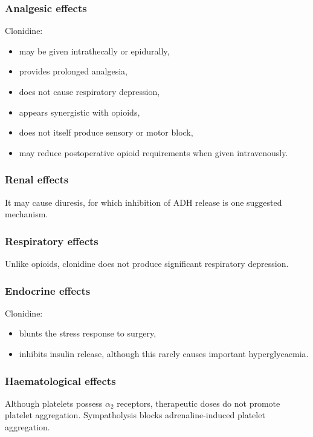 \documentclass[11pt,a4paper]{article}
\begin{document}
\subsubsection{Analgesic effects}

Clonidine:
\begin{itemize}
    \item may be given intrathecally or epidurally,
    \item provides prolonged analgesia,
    \item does not cause respiratory depression,
    \item appears synergistic with opioids,
    \item does not itself produce sensory or motor block,
    \item may reduce postoperative opioid requirements when given intravenously.
\end{itemize}

\subsubsection{Renal effects}

It may cause diuresis, for which inhibition of ADH release is one suggested mechanism.

\subsubsection{Respiratory effects}

Unlike opioids, clonidine does not produce significant respiratory depression.

\subsubsection{Endocrine effects}

Clonidine:
\begin{itemize}
    \item blunts the stress response to surgery,
    \item inhibits insulin release, although this rarely causes important hyperglycaemia.
\end{itemize}

\subsubsection{Haematological effects}

Although platelets possess $\alpha_2$ receptors, therapeutic doses do not promote platelet aggregation. Sympatholysis blocks adrenaline-induced platelet aggregation.
\end{document}
